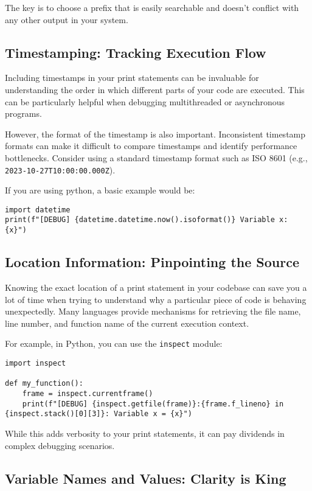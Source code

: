 \documentclass{article}
\begin{document}
The key is to choose a prefix that is easily searchable and doesn't conflict with any other output in your system.

\subsection*{Timestamping: Tracking Execution Flow}

Including timestamps in your print statements can be invaluable for understanding the order in which different parts of your code are executed.  This can be particularly helpful when debugging multithreaded or asynchronous programs.

However, the format of the timestamp is also important.  Inconsistent timestamp formats can make it difficult to compare timestamps and identify performance bottlenecks.  Consider using a standard timestamp format such as ISO 8601 (e.g., \texttt{2023-10-27T10:00:00.000Z}).

If you are using python, a basic example would be:
\begin{verbatim}
import datetime
print(f"[DEBUG] {datetime.datetime.now().isoformat()} Variable x: {x}")
\end{verbatim}

\subsection*{Location Information: Pinpointing the Source}

Knowing the exact location of a print statement in your codebase can save you a lot of time when trying to understand why a particular piece of code is behaving unexpectedly.  Many languages provide mechanisms for retrieving the file name, line number, and function name of the current execution context.

For example, in Python, you can use the \texttt{inspect} module:

\begin{verbatim}
import inspect

def my_function():
    frame = inspect.currentframe()
    print(f"[DEBUG] {inspect.getfile(frame)}:{frame.f_lineno} in {inspect.stack()[0][3]}: Variable x = {x}")
\end{verbatim}

While this adds verbosity to your print statements, it can pay dividends in complex debugging scenarios.

\subsection*{Variable Names and Values: Clarity is King}
\end{document}

